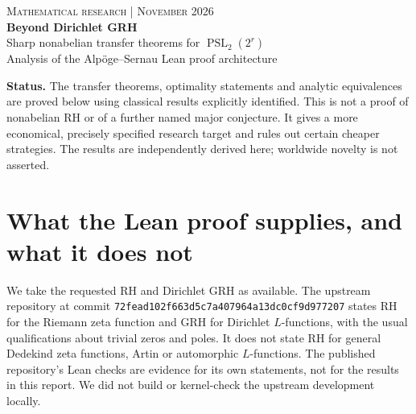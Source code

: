 \documentclass[11pt]{article}
\theoremstyle{remark}\newtheorem{remark}[theorem]{Remark}
\DeclareMathOperator{\PSL}{PSL}\DeclareMathOperator{\SL}{SL}\DeclareMathOperator{\PGL}{PGL}\DeclareMathOperator{\Ind}{Ind}\DeclareMathOperator{\ord}{ord}\DeclareMathOperator{\Gal}{Gal}\DeclareMathOperator{\Tr}{Tr}\DeclareMathOperator{\Rea}{Re}\DeclareMathOperator{\FP}{FP}
\newcommand{\Q}{\mathbb Q}\newcommand{\C}{\mathbb C}\newcommand{\F}{\mathbb F}\newcommand{\one}{\mathbf 1}\newcommand{\St}{\mathrm{St}}\newcommand{\Gg}{\Gamma}\newcommand{\PT}{\mathcal P}\newcommand{\eps}{\varepsilon}
\newcommand{\repo}{\texttt{grh-lean}}
\begin{document}
\begin{center}
{\small\color{navy}\textsc{Mathematical research \enspace| November 2026}}\\[10pt]
{\LARGE\bfseries Beyond Dirichlet GRH}\\[4pt]
{\Large Sharp nonabelian transfer theorems for $\PSL_2(2^r)$}\\[8pt]
{\small Analysis of the Alp\"oge--Sernau Lean proof architecture}
\end{center}
\begin{abstract}
The Lean development \repo\ establishes the Riemann hypothesis for Dirichlet $L$-functions. We extract a different target for its one-sided prime-sum method: Dedekind-zeta RH for every Galois extension $M/\Q$ with group $\PSL_2(q)$, $q=2^r\ge4$. We construct a nonnegative character $W$ of dimension $q^2$ containing each irreducible exactly once, prove its dimension is minimal among such nonnegative detecting characters, and show that a single zeta function of degree $q(q+1)$, or two of degrees $q+1$ and $q(q-1)$, suffice for RH of $\zeta_M$. Both degree thresholds are sharp for detection by subfield permutation characters. No Artin holomorphy conjecture is assumed. We reduce the outstanding RH to a one-sided inequality counting rational primes with zero, one, two, or $q+1$ roots of a degree-$q+1$ polynomial modulo $p$. The inequality has the same smoothed kernel and exponent as the Lean proof, but its arithmetic establishment remains open. Exact finite group checks for $q=4,8,16$ accompany the general proofs; subgroup searches for $q=4,8$ are exhaustive.
\end{abstract}
\noindent\textbf{Status.} The transfer theorems, optimality statements and analytic equivalences are proved below using classical results explicitly identified. This is not a proof of nonabelian RH or of a further named major conjecture. It gives a more economical, precisely specified research target and rules out certain cheaper strategies. The results are independently derived here; worldwide novelty is not asserted.
\tableofcontents

\section{What the Lean proof supplies, and what it does not}
We take the requested RH and Dirichlet GRH as available. The upstream repository \cite{lean} at commit \texttt{72fead102f663d5c7a407964a13dc0cf9d977207} states RH for the Riemann zeta function and GRH for Dirichlet $L$-functions, with the usual qualifications about trivial zeros and poles. It does not state RH for general Dedekind zeta functions, Artin or automorphic $L$-functions. The published repository's Lean checks are evidence for its own statements, not for the results in this report. We did not build or kernel-check the upstream development locally.
\end{document}
